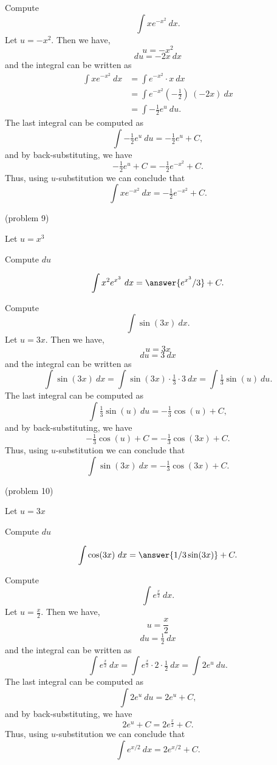 \documentclass[handout]{ximera}
\begin{document}
\begin{example}[example 9] Compute 
\[\int xe^{-x^2} \ dx.\]
Let $u = -x^2 $.  Then we have,
\[u = -x^2\]
\[du = -2x \ dx\]
and the integral can be written as
\begin{align*}
\int xe^{-x^2} \ dx &= \int e^{-x^2} \cdot x\  dx \\
&=  \int e^{-x^2}( -\tfrac12)\ (-2x)\  dx \\
&=  \int -\tfrac12 e^u \ du.
\end{align*}
The last integral can be computed as 
\[ \int -\tfrac12 e^u \ du = -\tfrac12 e^u + C,\]
and by back-substituting, we have 
\[-\tfrac12 e^u + C = -\tfrac12 e^{-x^2} + C.\]
Thus, using $u$-substitution we can conclude that
\[\int xe^{-x^2} \ dx =  -\tfrac12 e^{-x^2} + C.\]
\end{example}


\begin{problem}(problem 9)
\begin{hint}
Let $u = x^3$
\end{hint}
\begin{hint}
Compute $du$
\end{hint}
\[\int x^2e^{x^3} \ dx = \answer{e^{x^3}/3} +C.\]
\end{problem}




\begin{example}[example 10] Compute 
\[\int \sin(3x) \ dx.\]
Let $u = 3x$.  Then we have,
\[u = 3x\]
\[du = 3 \ dx\]
and the integral can be written as 
\[\int\sin(3x) \ dx =  \int \sin(3x) \cdot \tfrac13\cdot 3 \   dx =   \int \tfrac13 \sin(u) \ du.\]
The last integral can be computed as 
\[ \int \tfrac13 \sin(u) \ du = -\tfrac13 \cos(u) + C,\]
and by back-substituting, we have 
\[-\tfrac13 \cos(u) + C = -\tfrac13 \cos(3x) + C.\]
Thus, using $u$-substitution we can conclude that
\[\int \sin(3x) \ dx =  -\tfrac13 \cos(3x) + C.\]
\end{example}

\begin{problem}(problem 10)
\begin{hint}
Let $u = 3x$
\end{hint}
\begin{hint}
Compute $du$
\end{hint}
\[\int \cos(3x) \ dx = \answer{1/3 \sin(3x)} +C.\]
\end{problem}






\begin{example}[example 11] Compute 
\[\int e^{\frac{x}{2}} \ dx.\]
Let $u = \frac{x}{2}$.  Then we have,
\[u = \frac{x}{2}\]
\[du = \tfrac12 \ dx\]
and the integral can be written as 
\[\int e^{\frac{x}{2}} \ dx =  \int e^{\frac{x}{2}} \cdot 2\cdot \tfrac{1}{2}  \   dx =   \int 2e^u \ du.\]
The last integral can be computed as 
\[\int 2e^u \ du = 2 e^u + C,\]
and by back-substituting, we have 
\[2e^u + C = 2e^{\frac{x}{2}}+ C.\]
Thus, using $u$-substitution we can conclude that
\[\int e^{x/2} \ dx = 2e^{x/2} + C.\]
\end{example}
\end{document}
